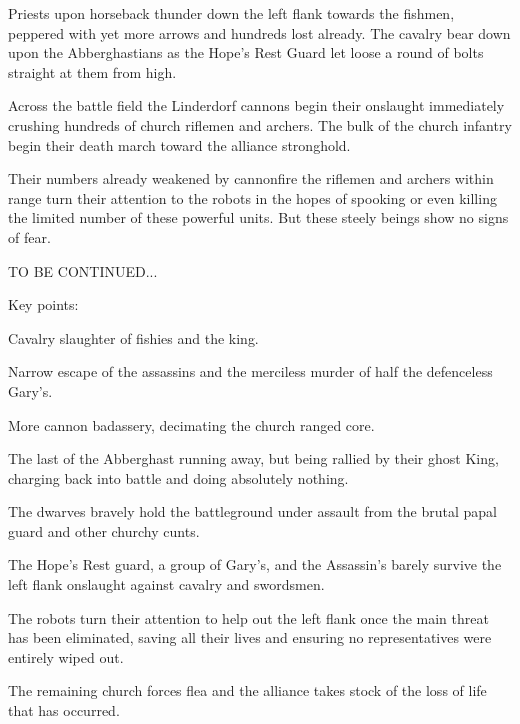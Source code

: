 Priests upon horseback thunder down the left flank towards the fishmen, peppered with yet more arrows and hundreds lost already. The cavalry bear down upon the Abberghastians as the Hope's Rest Guard let loose a round of bolts straight at them from high.\medskip

Across the battle field the Linderdorf cannons begin their onslaught immediately crushing hundreds of church riflemen and archers. The bulk of the church infantry begin their death march toward the alliance stronghold.\medskip

Their numbers already weakened by cannonfire the riflemen and archers within range turn their attention to the robots in the hopes of spooking or even killing the limited number of these powerful units. But these steely beings show no signs of fear.\medskip

TO BE CONTINUED...\medskip

Key points:\medskip

Cavalry slaughter of fishies and the king.\medskip

Narrow escape of the assassins and the merciless murder of half the defenceless Gary's.\medskip

More cannon badassery, decimating the church ranged core.\medskip

The last of the Abberghast running away, but being rallied by their ghost King, charging back into battle and doing absolutely nothing.\medskip

The dwarves bravely hold the battleground under assault from the brutal papal guard and other churchy cunts.\medskip

The Hope's Rest guard, a group of Gary's, and the Assassin's barely survive the left flank onslaught against cavalry and swordsmen.\medskip

The robots turn their attention to help out the left flank once the main threat has been eliminated, saving all their lives and ensuring no representatives were entirely wiped out.\medskip

The remaining church forces flea and the alliance takes stock of the loss of life that has occurred.\medskip

%

\clearpage
